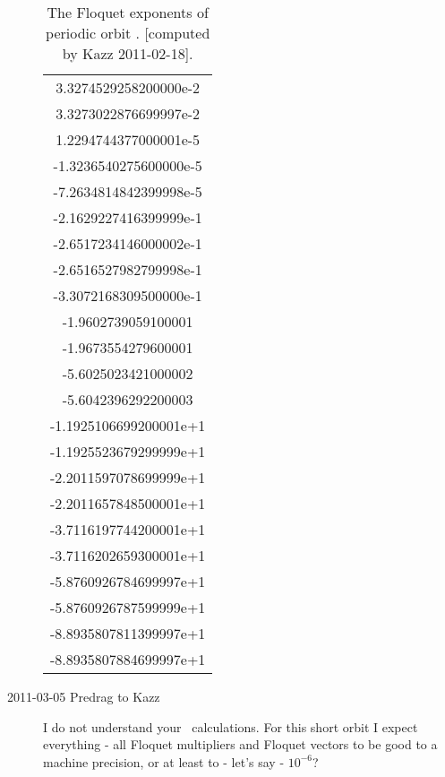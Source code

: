 \begin{description}
  \begin{table}[h!]
    \caption{The Floquet exponents of periodic orbit .
      [computed by Kazz 2011-02-18].
    }\label{tab:ks22po10.25FloqExp}
    \begin{center}
      \begin{tabular}{c}
        3.3274529258200000e-2    \\
        3.3273022876699997e-2    \\
        1.2294744377000001e-5    \\
        -1.3236540275600000e-5    \\
        -7.2634814842399998e-5    \\
        -2.1629227416399999e-1    \\
        -2.6517234146000002e-1    \\
        -2.6516527982799998e-1    \\
        -3.3072168309500000e-1    \\
        -1.9602739059100001    \\
        -1.9673554279600001    \\
        -5.6025023421000002    \\
        -5.6042396292200003    \\
        -1.1925106699200001e+1    \\
        -1.1925523679299999e+1    \\
        -2.2011597078699999e+1    \\
        -2.2011657848500001e+1    \\
        -3.7116197744200001e+1    \\
        -3.7116202659300001e+1    \\
        -5.8760926784699997e+1    \\
        -5.8760926787599999e+1    \\
        -8.8935807811399997e+1    \\
        -8.8935807884699997e+1    \\
      \end{tabular}
    \end{center}
  \end{table}


\item[2011-03-05 Predrag to Kazz] I do not understand your \po\ calculations.
  For this short orbit I expect everything - all Floquet multipliers and
  Floquet vectors to be good to a machine precision, or at least to - let's say -
  $10^{-6}$?


\end{description}
